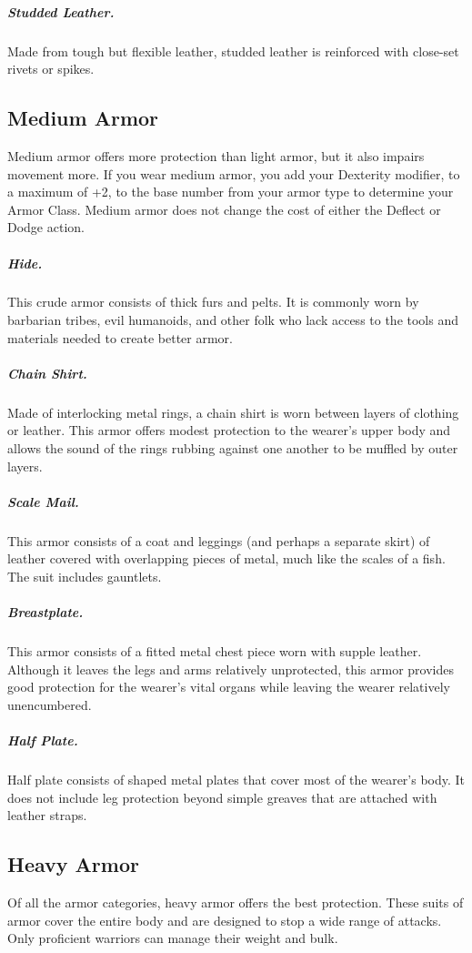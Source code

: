 \subparagraph*{Studded Leather.} Made from tough but flexible leather, studded leather is reinforced with close-set rivets or spikes.

\subsection{Medium Armor}

Medium armor offers more protection than light armor, but it also impairs movement more. If you wear medium armor, you add your Dexterity modifier, to a maximum of +2, to the base number from your armor type to determine your Armor Class. Medium armor does not change the cost of either the Deflect or Dodge action.

\subparagraph*{Hide.} This crude armor consists of thick furs and pelts. It is commonly worn by barbarian tribes, evil humanoids, and other folk who lack access to the tools and materials needed to create better armor.

\subparagraph*{Chain Shirt.} Made of interlocking metal rings, a chain shirt is worn between layers of clothing or leather. This armor offers modest protection to the wearer's upper body and allows the sound of the rings rubbing against one another to be muffled by outer layers.

\subparagraph*{Scale Mail.} This armor consists of a coat and leggings (and perhaps a separate skirt) of leather covered with overlapping pieces of metal, much like the scales of a fish. The suit includes gauntlets.

\subparagraph*{Breastplate.} This armor consists of a fitted metal chest piece worn with supple leather. Although it leaves the legs and arms relatively unprotected, this armor provides good protection for the wearer's vital organs while leaving the wearer relatively unencumbered.

\subparagraph*{Half Plate.} Half plate consists of shaped metal plates that cover most of the wearer's body. It does not include leg protection beyond simple greaves that are attached with leather straps.

\subsection{Heavy Armor}

Of all the armor categories, heavy armor offers the best protection. These suits of armor cover the entire body and are designed to stop a wide range of attacks. Only proficient warriors can manage their weight and bulk.

